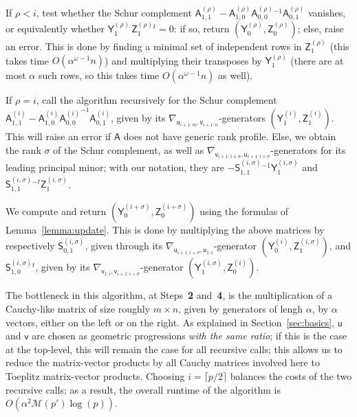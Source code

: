 \documentclass{sig-alternate}
\newcommand{\vu}{\ensuremath{\mathsf{u}}}
\newcommand{\vv}{\ensuremath{\mathsf{v}}}
\newcommand{\mA}{\ensuremath{\mathsf{A}}}
\newcommand{\mS}{\ensuremath{\mathsf{S}}}
\newcommand{\mY}{\ensuremath{\mathsf{Y}}}
\newcommand{\mZ}{\ensuremath{\mathsf{Z}}}
\newcommand{\M}{\ensuremath{\mathscr{M}}}
\begin{document}
\smallskip{} If $\rho < i$, test whether the Schur
complement $ \mA^{(\rho)}_{1,1} - \mA^{(\rho)}_{1,0} \mA^{(\rho)}_{0,0}{}^{-1} \mA^{(\rho)}_{0,1}$ vanishes, or
equivalently whether $\mY^{(\rho)}_1\,
\mZ^{(\rho)}_1{}^t = 0$: if so, return $(\mY^{(\rho)}_0,\mZ^{(\rho)}_0)$; else,
raise an error. This is done by finding a minimal set of
independent rows in $\mZ^{(\rho)}_1$ (this takes time $O(\alpha^{\omega-1}
n)$) and multiplying their transposes  by ${\mY^{(\rho)}_1}$ (there are at most
$\alpha$ such rows, so this takes time $O(\alpha^{\omega-1} n)$ as
well).

\smallskip{} If $\rho=i$, call the algorithm
recursively for the Schur complement $\mA^{(i)}_{1,1} -
\mA^{(i)}_{1,0} {\mA^{(i)}_{0,0}}^{-1} \mA^{(i)}_{0,1}$, given by its
$\nabla_{\vu_{i+1:m},\vv_{i+1:n}}$-generators
$(\mY^{(i)}_1,\mZ^{(i)}_1)$. This will raise an error if $\mA$ does
not have generic rank profile. Else, we obtain the rank $\sigma$ of the
Schur complement, as well as
$\nabla_{\vv_{i+1:i+\sigma},\vu_{i+1:i+\sigma}}$-generators for its
leading principal minor; with our notation, they are
$-\mS^{(i,\sigma)}_{1,1}{}^{-1} \mY^{(i,\sigma)}_1$ and
$\mS^{(i,\sigma)}_{1,1}{}^{-t} \mZ^{(i,\sigma)}_1$.  

\smallskip{}  We compute and return
$(\mY^{(i+\sigma)}_0,\mZ^{(i+\sigma)}_0)$ using the formulas of
Lemma~\ref{lemma:update}.  This is done by multiplying the above
matrices by respectively $\mS^{(i,\sigma)}_{0,1}$, given through its
$\nabla_{\vu_{i+1:i+\sigma},\vu_{1:i}}$-generator
$(\mY^{(i)}_0,\mZ^{(i,\sigma)}_{1})$, and
$\mS^{(i,\sigma)}_{1,0}{}^t$, given by its
$\nabla_{\vv_{1:i},\vv_{i+1:i+\sigma}}$-genera\-tor
$(\mY^{(i,\sigma)}_1,\mZ^{(i)}_0)$.

\medskip

The bottleneck in this algorithm, at Steps~{\bf 2} and~{\bf 4}, is the
multiplication of a Cauchy-like matrix of size roughly $m \times n$,
given by generators of lengh $\alpha$, by $\alpha$ vectors, either on
the left or on the right. As explained in Section~\ref{sec:basics},
$\vu$ and $\vv$ are chosen as geometric progressions {\em with the
  same ratio}; if this is the case at the top-level, this will remain
the case for all recursive calls; this allows us to reduce the
matrix-vector products by all Cauchy matrices involved here to
Toeplitz matrix-vector products. Choosing $i=\lceil p/2\rceil$
balances the costs of the two recursive calls; as a result, the
overall runtime of the algorithm is $O(\alpha^2 \M(p') \log(p))$.
\end{document}
